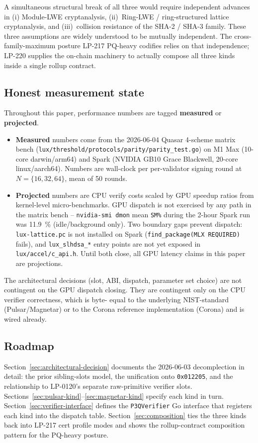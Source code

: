 A simultaneous structural break of all three would require
independent advances in (i) Module-LWE cryptanalysis,
(ii)~Ring-LWE / ring-structured lattice cryptanalysis, and
(iii)~collision resistance of the SHA-2 / SHA-3 family. These
three assumptions are widely understood to be mutually
independent. The cross-family-maximum posture LP-217 PQ-heavy
codifies relies on that independence; LP-220 supplies the
on-chain machinery to actually compose all three kinds inside a
single rollup contract.

\subsection{Honest measurement state}

Throughout this paper, performance numbers are tagged
\textbf{measured} or \textbf{projected}.

\begin{itemize}[leftmargin=2em,nosep]
\item \textbf{Measured} numbers come from the
  2026-06-04 Quasar 4-scheme matrix bench
  (\texttt{lux/threshold/protocols/parity/parity\_test.go}) on
  M1 Max (10-core darwin/arm64) and Spark (NVIDIA GB10 Grace
  Blackwell, 20-core linux/aarch64). Numbers are wall-clock per
  per-validator signing round at $N{=}\{16,32,64\}$, mean of 50
  rounds.
\item \textbf{Projected} numbers are CPU verify costs scaled by
  GPU speedup ratios from kernel-level micro-benchmarks. GPU
  dispatch is not exercised by any path in the matrix bench --
  \texttt{nvidia-smi dmon} mean \texttt{SM\%} during the 2-hour
  Spark run was \SI{11.9}{\percent} (idle/background only). Two
  boundary gaps prevent dispatch: \texttt{lux-lattice.pc} is not
  installed on Spark (\texttt{find\_package(MLX REQUIRED)}
  fails), and \texttt{lux\_slhdsa\_*} entry points are not yet
  exposed in \texttt{lux/accel/c\_api.h}. Until both close, all
  GPU latency claims in this paper are projections.
\end{itemize}

The architectural decisions (slot, ABI, dispatch, parameter set
choice) are not contingent on the GPU dispatch closing. They are
contingent only on the CPU verifier correctness, which is byte-
equal to the underlying NIST-standard (Pulsar/Magnetar) or to
the Corona reference implementation (Corona) and is wired
already.

\subsection{Roadmap}

Section~\ref{sec:architectural-decision} documents the
2026-06-03 decomplection in detail: the prior sibling-slots model,
the unification onto \texttt{0x012205}, and the relationship to
LP-0120's separate raw-primitive verifier slots.
Sections~\ref{sec:pulsar-kind}--\ref{sec:magnetar-kind} specify
each kind in turn. Section~\ref{sec:verifier-interface} defines
the \texttt{P3QVerifier} Go interface that registers each kind
into the dispatch table. Section~\ref{sec:composition} ties the
three kinds back into LP-217 cert profile modes and shows the
rollup-contract composition pattern for the PQ-heavy posture.

